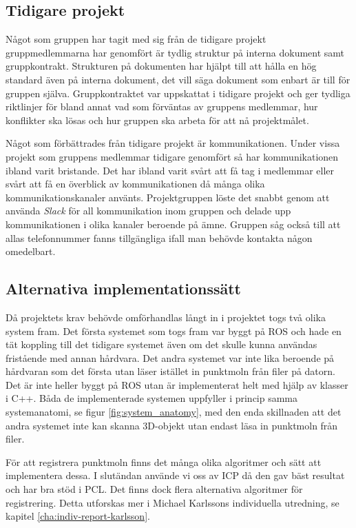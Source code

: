 \subsection{Tidigare projekt}
Något som gruppen har tagit med sig från de tidigare projekt gruppmedlemmarna har genomfört är tydlig struktur på interna dokument samt gruppkontrakt. Strukturen på dokumenten har hjälpt till att hålla en hög standard även på interna dokument, det vill säga dokument som enbart är till för gruppen själva. Gruppkontraktet var uppskattat i tidigare projekt och ger tydliga riktlinjer för bland annat vad som förväntas av gruppens medlemmar, hur konflikter ska lösas och hur gruppen ska arbeta för att nå projektmålet.

Något som förbättrades från tidigare projekt är kommunikationen. Under vissa projekt som gruppens medlemmar tidigare genomfört så har kommunikationen ibland varit bristande. Det har ibland varit svårt att få tag i medlemmar eller svårt att få en överblick av kommunikationen då många olika kommunikationskanaler använts. Projektgruppen löste det snabbt genom att använda \textit{Slack} för all kommunikation inom gruppen och delade upp kommunikationen i olika kanaler beroende på ämne. Gruppen såg också till att allas telefonnummer fanns tillgängliga ifall man behövde kontakta någon omedelbart.


\subsection{Alternativa implementationssätt}
Då projektets krav behövde omförhandlas långt in i projektet togs två olika system fram. Det första systemet som togs fram var byggt på ROS och hade en tät koppling till det tidigare systemet även om det skulle kunna användas fristående med annan hårdvara. Det andra systemet var inte lika beroende på hårdvaran som det första utan läser istället in punktmoln från filer på datorn. Det är inte heller byggt på ROS utan är implementerat helt med hjälp av klasser i C++. Båda de implementerade systemen uppfyller i princip samma systemanatomi, se figur \ref{fig:system_anatomy}, med den enda skillnaden att det andra systemet inte kan skanna 3D-objekt utan endast läsa in punktmoln från filer.

För att registrera punktmoln finns det många olika algoritmer och sätt att implementera dessa. I slutändan använde vi oss av ICP då den gav bäst resultat och har bra stöd i PCL. Det finns dock flera alternativa algoritmer för registrering. Detta utforskas mer i Michael Karlssons individuella utredning, se kapitel \ref{cha:indiv-report-karlsson}.

